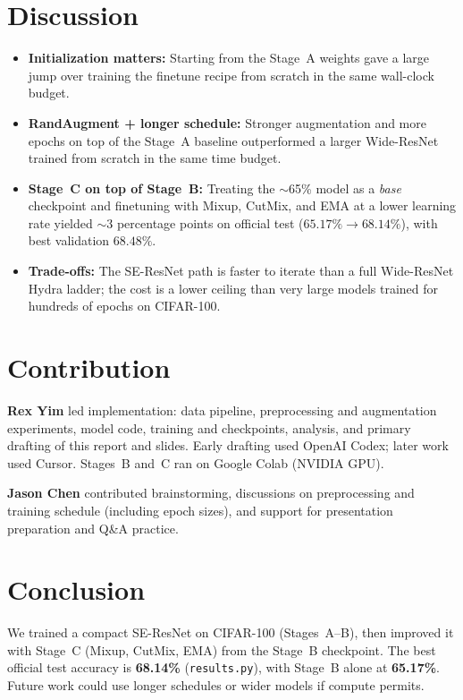 \documentclass[11pt,a4paper]{article}
\begin{document}
\section{Discussion}
\begin{itemize}[leftmargin=1.2em]
    \item \textbf{Initialization matters:} Starting from the Stage~A weights gave a large jump over training the finetune recipe from scratch in the same wall-clock budget.
    \item \textbf{RandAugment + longer schedule:} Stronger augmentation and more epochs on top of the Stage~A baseline outperformed a larger Wide-ResNet trained from scratch in the same time budget.
    \item \textbf{Stage~C on top of Stage~B:} Treating the $\sim$65\% model as a \emph{base} checkpoint and finetuning with Mixup, CutMix, and EMA at a lower learning rate yielded $\sim$3 percentage points on official test ($65.17\% \rightarrow 68.14\%$), with best validation $68.48\%$.
    \item \textbf{Trade-offs:} The SE-ResNet path is faster to iterate than a full Wide-ResNet Hydra ladder; the cost is a lower ceiling than very large models trained for hundreds of epochs on CIFAR-100.
\end{itemize}

\section{Contribution}
\textbf{Rex Yim} led implementation: data pipeline, preprocessing and augmentation experiments, model code, training and checkpoints, analysis, and primary drafting of this report and slides. Early drafting used OpenAI Codex; later work used Cursor. Stages~B and~C ran on Google Colab (NVIDIA GPU).

\textbf{Jason Chen} contributed brainstorming, discussions on preprocessing and training schedule (including epoch sizes), and support for presentation preparation and Q\&A practice.

\section{Conclusion}
We trained a compact SE-ResNet on CIFAR-100 (Stages~A--B), then improved it with Stage~C (Mixup, CutMix, EMA) from the Stage~B checkpoint. The best official test accuracy is \textbf{68.14\%} (\texttt{results.py}), with Stage~B alone at \textbf{65.17\%}. Future work could use longer schedules or wider models if compute permits.
\end{document}
